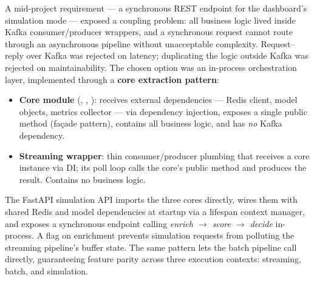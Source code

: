 A mid-project requirement --- a synchronous REST endpoint for the dashboard's simulation mode --- exposed a coupling problem: all business logic lived inside Kafka consumer/producer wrappers, and a synchronous  request cannot route through an asynchronous pipeline without unacceptable complexity. Request--reply over Kafka was rejected on latency; duplicating the logic outside Kafka was rejected on maintainability. The chosen option was an in-process orchestration layer, implemented through a \textbf{core extraction pattern}:

\begin{itemize}
  \item \textbf{Core module} (, , ): receives external dependencies --- Redis client, model objects, metrics collector --- via dependency injection, exposes a single public method (fa\c{c}ade pattern), contains all business logic, and has \emph{no} Kafka dependency.
  \item \textbf{Streaming wrapper}: thin consumer/producer plumbing that receives a core instance via DI; its poll loop calls the core's public method and produces the result. Contains no business logic.
\end{itemize}

The FastAPI simulation API imports the three cores directly, wires them with shared Redis and model dependencies at startup via a lifespan context manager, and exposes a synchronous  endpoint calling \emph{enrich $\to$ score $\to$ decide} in-process. A  flag on enrichment prevents simulation requests from polluting the streaming pipeline's buffer state. The same pattern lets the batch pipeline call  directly, guaranteeing feature parity across three execution contexts: streaming, batch, and simulation.
